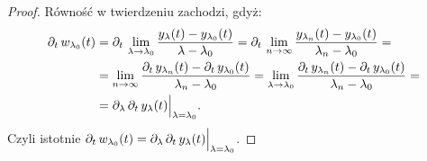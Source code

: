 \begin{proof}
	Równość w twierdzeniu zachodzi, gdyż:
%
	\begin{align*}
  	\pd{t} w_{\l_0}(t) &= \pd{t} \lim_{\l \to \l_0}  \frac{ y_\l(t) - y_{\l_0}(t) }{ \l - \l_0 } = \pd{t} \lim_{n \to 
  	\infty}
  	\frac{ y_{\l_n}(t) - y_{\l_0}(t) }{ \l_n - \l_0 } = \\
  	&= \lim_{n \to \infty} \frac{  \pd{t} y_{\l_n}(t) -  \pd{t} y_{\l_0}(t) }{ \l_n - \l_0 } = \lim_{\l \to \l_0} 
  	\frac{  
  	\pd{t} y_{\l_n}(t) -  \pd{t} y_{\l_0}(t) }{ \l_n - \l_0 } = \\
  	& = \pd{\l } \pd{t} y_\l (t) \Big\vert_{ \l = \l_0 } \text{.}
	\end{align*}
%
	Czyli istotnie $\pd{t} w_{\l_0}(t) = \pd{\l } \pd{t} y_\l (t) \Big\vert_{ \l = \l_0 }$.
\end{proof}


























